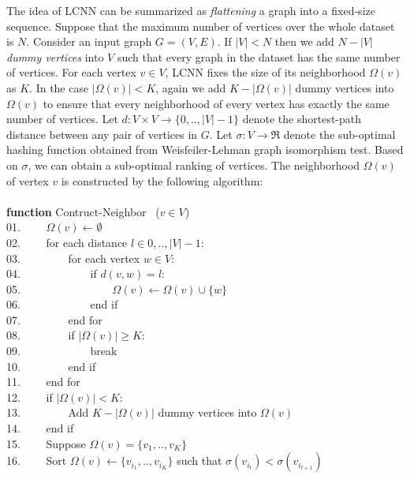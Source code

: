 \documentclass[a4paper]{article}
\begin{document}
The idea of LCNN can be summarized as \textit{flattening} a graph into a fixed-size sequence. Suppose that the maximum number of vertices over the whole dataset is $N$. Consider an input graph $G = (V, E)$. If $|V| < N$ then we add $N - |V|$ \textit{dummy vertices} into $V$ such that every graph in the dataset has the same number of vertices. For each vertex $v \in V$, LCNN fixes the size of its neighborhood $\Omega(v)$ as $K$. In the case $|\Omega(v)| < K$, again we add $K - |\Omega(v)|$ dummy vertices into $\Omega(v)$ to ensure that every neighborhood of every vertex has exactly the same number of vertices. Let $d: V \times V \rightarrow \{0, .., |V| - 1\}$ denote the shortest-path distance between any pair of vertices in $G$. Let $\sigma: V \rightarrow \Re$ denote the sub-optimal hashing function obtained from Weisfeiler-Lehman graph isomorphism test. Based on $\sigma$, we can obtain a sub-optimal ranking of vertices. The neighborhood $\Omega(v)$ of vertex $v$ is constructed by the following algorithm: \\ \\
\textbf{function} Contruct-Neighbor \ ($v \in V$) \\
01. \ \ \ \ $\Omega(v) \leftarrow \emptyset$ \\
02. \ \ \ \ for each distance $l \in {0, .., |V| - 1}$: \\
03. \ \ \ \ \ \ \ \ for each vertex $w \in V$: \\
04. \ \ \ \ \ \ \ \ \ \ \ \ if $d(v, w) = l$: \\
05. \ \ \ \ \ \ \ \ \ \ \ \ \ \ \ \ $\Omega(v) \leftarrow \Omega(v) \cup \{w\}$ \\
06. \ \ \ \ \ \ \ \ \ \ \ \ end if \\
07. \ \ \ \ \ \ \ \ end for \\
08. \ \ \ \ \ \ \ \ if $|\Omega(v)| \ge K$: \\
09. \ \ \ \ \ \ \ \ \ \ \ \ break \\
10. \ \ \ \ \ \ \ \ end if \\
11. \ \ \ \ end for \\
12. \ \ \ \ if $|\Omega(v)| < K$: \\
13. \ \ \ \ \ \ \ \ Add $K - |\Omega(v)|$ dummy vertices into $\Omega(v)$ \\
14. \ \ \ \ end if \\
15. \ \ \ \ Suppose $\Omega(v) = \{v_1, .., v_K\}$ \\
16. \ \ \ \ Sort $\Omega(v) \leftarrow \{v_{i_1}, .., v_{i_K}\}$ such that $\sigma(v_{i_t}) < \sigma(v_{i_{t + 1}})$ \\
\end{document}
